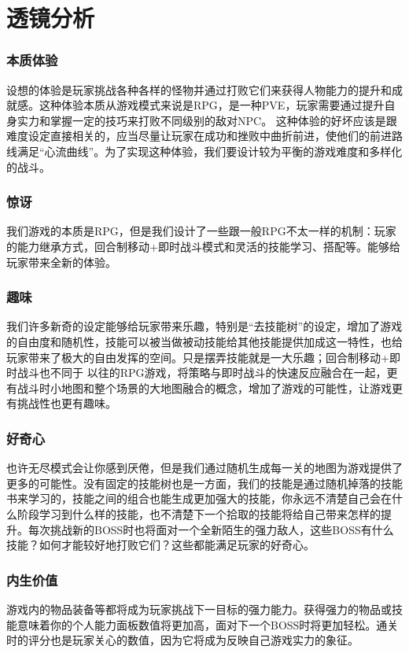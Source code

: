 \documentclass{article}
\begin{document}
\section{透镜分析}
\subsubsection{本质体验}
设想的体验是玩家挑战各种各样的怪物并通过打败它们来获得人物能力的提升和成就感。这种体验本质从游戏模式来说是RPG，是一种PVE，玩家需要通过提升自身实力和掌握一定的技巧来打败不同级别的敌对NPC。
这种体验的好坏应该是跟难度设定直接相关的，应当尽量让玩家在成功和挫败中曲折前进，使他们的前进路线满足“心流曲线”。为了实现这种体验，我们要设计较为平衡的游戏难度和多样化的战斗。
\subsubsection{惊讶}
我们游戏的本质是RPG，但是我们设计了一些跟一般RPG不太一样的机制：玩家的能力继承方式，回合制移动+即时战斗模式和灵活的技能学习、搭配等。能够给玩家带来全新的体验。
\subsubsection{趣味}
我们许多新奇的设定能够给玩家带来乐趣，特别是“去技能树”的设定，增加了游戏的自由度和随机性，技能可以被当做被动技能给其他技能提供加成这一特性，也给玩家带来了极大的自由发挥的空间。只是摆弄技能就是一大乐趣；回合制移动+即时战斗也不同于
以往的RPG游戏，将策略与即时战斗的快速反应融合在一起，更有战斗时小地图和整个场景的大地图融合的概念，增加了游戏的可能性，让游戏更有挑战性也更有趣味。
\subsubsection{好奇心}
也许无尽模式会让你感到厌倦，但是我们通过随机生成每一关的地图为游戏提供了更多的可能性。没有固定的技能树也是一方面，我们的技能是通过随机掉落的技能书来学习的，技能之间的组合也能生成更加强大的技能，你永远不清楚自己会在什么阶段学习到什么样的技能，也不清楚下一个拾取的技能将给自己带来怎样的提升。每次挑战新的BOSS时也将面对一个全新陌生的强力敌人，这些BOSS有什么技能？如何才能较好地打败它们？这些都能满足玩家的好奇心。
\subsubsection{内生价值}
游戏内的物品装备等都将成为玩家挑战下一目标的强力能力。获得强力的物品或技能意味着你的个人能力面板数值将更加高，面对下一个BOSS时将更加轻松。通关时的评分也是玩家关心的数值，因为它将成为反映自己游戏实力的象征。
\end{document}
